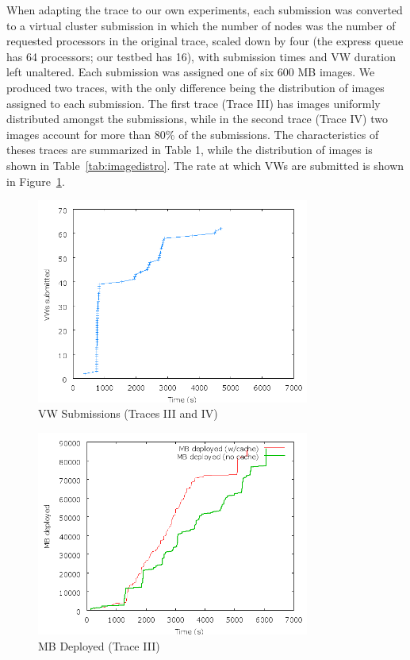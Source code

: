 When adapting the trace to our own experiments, each submission was
converted to a virtual cluster submission in which the number of nodes
was the number of requested processors in the original trace, scaled
down by four (the express queue has 64 processors; our testbed has 16),
with submission times and VW duration left unaltered. Each submission
was assigned one of six 600 MB images. We produced two traces,
with the only difference being the distribution of images assigned to
each submission. The first trace (Trace III) has images uniformly
distributed amongst the submissions, while in the second trace (Trace
IV) two images account for more than 80\% of the submissions. The
characteristics of theses traces are summarized in Table 1, while the
distribution of images is shown in Table~\ref{tab:imagedistro}. The rate at which VWs are
submitted is shown in Figure~\ref{fig:providershape}.

\begin{figure}
  \begin{center}
    \includegraphics[width=0.8\textwidth]{figures/ProviderPerspective-TraceShape.png}
    \caption{VW Submissions (Traces III and IV)}
	\label{fig:providershape}
  \end{center}
\end{figure}

\begin{figure}
  \begin{center}
    \includegraphics[width=0.8\textwidth]{figures/ProviderPerspective-Uniform2.png}
    \caption{MB Deployed (Trace III)}
	\label{fig:providerIII}
  \end{center}
\end{figure}

